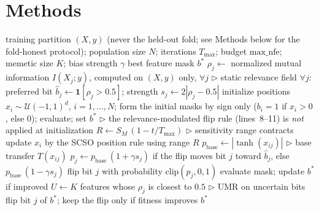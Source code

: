 \documentclass[iicol,sn-basic,pdflatex]{sn-jnl}
\begin{document}
\FloatBarrier
\section{Methods}
\label{sec:method}

\begin{algorithm}[!t]
\caption{RG-SCSO for binary feature selection}
\label{alg:main}
\begin{algorithmic}[1]
  \REQUIRE training partition $(X,y)$ (never the held-out fold; see Methods
    below for the fold-honest protocol); population size $N$; iterations
    $T_{\max}$; budget $\mathrm{max\_nfe}$; memetic size $K$; bias
    strength $\gamma$
  \ENSURE best feature mask $b^\ast$
  \STATE $\rho_j \leftarrow$ normalized mutual information $I(X_j;y)$,
    computed on $(X,y)$ only, $\forall j$ \hfill$\triangleright$ static
    relevance field
  \STATE $\forall j$: preferred bit $\hat{b}_j \leftarrow \mathbf{1}[\rho_j>0.5]$;
    strength $s_j \leftarrow 2|\rho_j-0.5|$
  \STATE initialize positions $x_i \sim \mathcal{U}(-1,1)^d$, $i=1,\dots,N$;
    form the initial masks by sign only ($b_i=1$ if $x_i>0$, else $0$);
    evaluate; set $b^\ast$ \hfill$\triangleright$ the relevance-modulated flip
    rule (lines~8--11) is \emph{not} applied at initialization
    \STATE $R \leftarrow S_M\,(1-t/T_{\max})$ \hfill$\triangleright$ sensitivity range contracts
      \STATE update $x_i$ by the SCSO position rule using range $R$
        \STATE $p_{\text{base}} \leftarrow |\tanh(x_{ij})|$ \hfill$\triangleright$ base transfer $T(x_{ij})$
        \STATE $p_j \leftarrow p_{\text{base}}\,(1+\gamma s_j)$ if the flip moves bit $j$ toward
          $\hat{b}_j$, else $p_{\text{base}}\,(1-\gamma s_j)$
        \STATE flip bit $j$ with probability $\mathrm{clip}(p_j,0,1)$
      \ENDFOR
      \STATE evaluate mask; update $b^\ast$ if improved
    \ENDFOR
    \STATE $U \leftarrow K$ features whose $\rho_j$ is closest to $0.5$
      \hfill$\triangleright$ UMR on uncertain bits
      \STATE flip bit $j$ of $b^\ast$; keep the flip only if fitness improves
    \ENDFOR
  \ENDWHILE
  \RETURN $b^\ast$
\end{algorithmic}
\end{algorithm}
\end{document}
